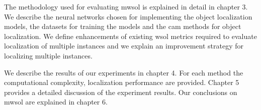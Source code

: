 The methodology used for evaluating \acrlong{mwsol} is explained in detail in chapter 3. We describe the neural networks chosen for implementing the object localization models, the datasets for training the models and the \acrshort{cam} methods for object localization. We define enhancements of existing \acrshort{wsol} metrics required to evaluate localization of multiple instances and we explain an improvement strategy for localizing multiple instances.

We describe the results of our experiments in chapter 4. For each method the computational complexity, localization performance are provided. Chapter 5 provides a detailed discussion of the experiment results. Our conclusions on \acrshort{mwsol} are explained in chapter 6.